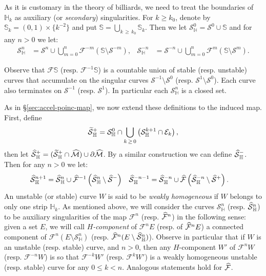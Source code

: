 \documentclass[AHL, Unicode, longabstracts,published]{cedram}
\newcommand{\inv}{^{-1}}
\newcommand{\hhs}{\mathbb{S}}
\newcommand{\homo}{\mathbb{H}}
\newcommand{\cE}{\mathcal E}
\newcommand{\cm}{\mathcal{F}}
\newcommand{\csp}{\mathcal{M}}
\newcommand{\cmp}{\hat\cm}
\newcommand{\cspi}{\widehat{\csp}}
\newcommand{\singPrivate}{\mathcal{S}}
\newcommand{\sing}[1]{\singPrivate^{#1}}
\newcommand{\singp}[1]{\hat{\singPrivate}^{#1}}
\newcommand{\hsing}[1]{{\singPrivate}_\homo^{#1}}
\newcommand{\hsingp}[1]{\hat{\singPrivate}_\homo^{#1}}
\newcommand{\singt}[1]{\tilde{\singPrivate}^{#1}}
\let\oldtilde\tilde
\renewcommand*{\tilde}[1]{\mathchoice{\widetilde{#1}}{\widetilde{#1}}{\oldtilde{#1}}{\oldtilde{#1}}}
\let\oldhat\hat
\renewcommand*{\hat}[1]{\mathchoice{\widehat{#1}}{\widehat{#1}}{\oldhat{#1}}{\oldhat{#1}}}
\begin{document}
As it is customary in the theory of billiards, we need to treat the boundaries of $\homo_k$ as auxiliary (or \emph{secondary}) singularities. For $k\ge k_{0}$, denote by $\hhs_{k} = (0,1)\times\{k^{-2}\}$ and put $\hhs = \bigcup_{k\,\ge\,k_{0}}\hhs_{k}$. Then we let $\hsing 0 = \sing0 \cup \hhs$ and for any $n > 0$ we let:
\begin{align}\label{e_definitionHSing}
\hsing{n} &= \sing n\cup \bigcup_{m = 0}^{n}\cm^{-m}(\hhs\setminus\sing{-m}),&
\hsing{-n} &= \sing{-n}\cup\bigcup_{m = 0}^{n} \cm^{m}(\hhs\setminus\sing{m}).
\end{align}
\begin{rema}\label{RkSCClosed}
Observe that $\cm\hhs$ (resp. $\cm^{-1}\hhs$) is a countable union of stable (resp. unstable) curves that accumulate on the singular curves $\sing{-1}\setminus\sing0$ (resp. $\sing{1}\setminus\sing0$). Each curve also terminates on $\sing{-1}$ (resp. $\sing{1}$). In particular each $\hsing n$ is a closed set.
\end{rema}

As in \S\ref{sec:accel-poinc-map}, we now extend these definitions to the induced map. First, define
\begin{align*}
\singt+_{\homo} = \hsing0 \cap \bigcup_{k\,\ge\,0}\left(\hsing{k+1}\cap\cE_{k}\right),
\end{align*}
then let $\hsingp+ = (\singt+_{\homo}\cap\cspi)\cup\partial\cspi$. By a similar construction we can define $\hsingp-$. Then for any $n > 0$ we let:
\begin{align}\label{e_definitionHSingp}
\hsingp{n+1} &= \hsingp n\cup\cmp\inv\left(\hsingp n\setminus\singp-\right)&
\hsingp{-n-1} &= \hsingp{-n}\cup\cmp\left(\hsingp{-n}\setminus\singp+\right).
\end{align}
An unstable (or stable) curve $W$ is said to be \emph{weakly homogeneous} if $W$ belongs to only one strip $\homo_{k}$. As mentioned above, we will consider the curves $\hsing{n}$ (resp. $\hsingp{n}$) to be auxiliary singularities of the map $\cm^{n}$ (resp. $\cmp^{n}$) in the following sense: given a set $E$, we will call \emph{$H$-component} of $\cm^{n}E$ (resp. of $\cmp^{n}E$) a connected component of $\cm^{n} (E\setminus\hsing{n})$ (resp. $\cmp^{n}(E\setminus\hsingp{n})$). Observe in particular that if $W$ is an unstable (resp. stable) curve, and $n > 0$, then any $H$-component $W'$ of $\cm^{n}W$ (resp. $\cm^{-n}W$) is so that $\cm^{-k}W'$ (resp. $\cm^{k}W'$) is a weakly homogeneous unstable (resp. stable) curve for any $0\le k < n$. Analogous statements hold for $\cmp$.
\end{document}
